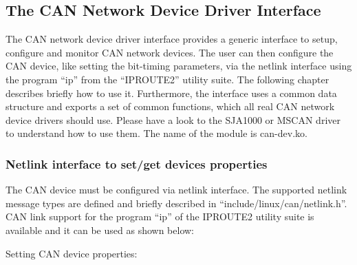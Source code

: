 \documentclass[a4paper,8pt,english]{sphinxmanual}
\begin{document}
\subsection{The CAN Network Device Driver Interface}
\label{networking/can:the-can-network-device-driver-interface}
The CAN network device driver interface provides a generic interface
to setup, configure and monitor CAN network devices. The user can then
configure the CAN device, like setting the bit-timing parameters, via
the netlink interface using the program ``ip'' from the ``IPROUTE2''
utility suite. The following chapter describes briefly how to use it.
Furthermore, the interface uses a common data structure and exports a
set of common functions, which all real CAN network device drivers
should use. Please have a look to the SJA1000 or MSCAN driver to
understand how to use them. The name of the module is can-dev.ko.


\subsubsection{Netlink interface to set/get devices properties}
\label{networking/can:netlink-interface-to-set-get-devices-properties}
The CAN device must be configured via netlink interface. The supported
netlink message types are defined and briefly described in
``include/linux/can/netlink.h''. CAN link support for the program ``ip''
of the IPROUTE2 utility suite is available and it can be used as shown
below:

Setting CAN device properties:
\end{document}
